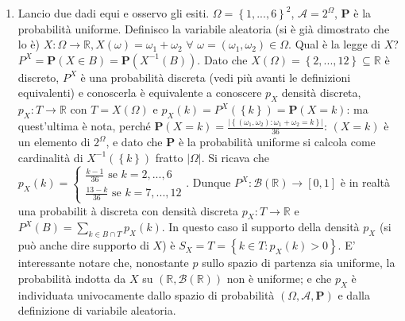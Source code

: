 \documentclass{article}
\begin{document}
\begin{enumerate}
\item Lancio due dadi equi e osservo gli esiti. $\Omega =\left\{
1,...,6\right\} ^{2}$, $\mathcal{A}=2^{\Omega }$, $\mathbf{P}$ \`{e} la
probabilit\`{a} uniforme. Definisco la variabile aleatoria (si \`{e} gi\`{a}
dimostrato che lo \`{e}) $X:\Omega \rightarrow 
\mathbb{R}
,X\left( \omega \right) =\omega _{1}+\omega _{2}$ $\forall $ $\omega =\left(
\omega _{1},\omega _{2}\right) \in \Omega $. Qual \`{e} la legge di $X$? $%
P^{X}=\mathbf{P}\left( X\in B\right) =\mathbf{P}\left( X^{-1}\left( B\right)
\right) $. Dato che $X\left( \Omega \right) =\left\{ 2,...,12\right\}
\subseteq 
\mathbb{R}
$ \`{e} discreto, $P^{X}$ \`{e} una probabilit\`{a} discreta (vedi pi\`{u}
avanti le definizioni equivalenti) e conoscerla \`{e} equivalente a
conoscere $p_{X}$ densit\`{a} discreta, $p_{X}:T\rightarrow 
\mathbb{R}
$ con $T=X\left( \Omega \right) $ e $p_{X}\left( k\right) =P^{X}\left(
\left\{ k\right\} \right) =\mathbf{P}\left( X=k\right) $: ma quest'ultima 
\`{e} nota, perch\'{e} $\mathbf{P}\left( X=k\right) =\frac{\left\vert
\left\{ \left( \omega _{1},\omega _{2}\right) :\omega _{1}+\omega
_{2}=k\right\} \right\vert }{36}$: $\left( X=k\right) $ \`{e} un elemento di 
$2^{\Omega }$, e dato che $\mathbf{P}$ \`{e} la probabilit\`{a} uniforme si
calcola come cardinalit\`{a} di $X^{-1}\left( \left\{ k\right\} \right) $
fratto $\left\vert \Omega \right\vert $. Si ricava che $p_{X}\left( k\right)
=\left\{ 
\begin{array}{c}
\frac{k-1}{36}\text{ se }k=2,...,6 \\ 
\frac{13-k}{36}\text{ se }k=7,...,12%
\end{array}%
\right. $. Dunque $P^{X}:\mathcal{B}\left( 
\mathbb{R}
\right) \rightarrow \left[ 0,1\right] $ \`{e} in realt\`{a} una probabilit%
\`{a} discreta con densit\`{a} discreta $p_{X}:T\rightarrow 
\mathbb{R}
$ e $P^{X}\left( B\right) =\sum_{k\in B\cap T}p_{X}\left( k\right) $. In
questo caso il supporto della densit\`{a} $p_{X}$ (si pu\`{o} anche dire
supporto di $X$) \`{e} $S_{X}=T=\left\{ k\in T:p_{X}\left( k\right)
>0\right\} $. E' interessante notare che, nonostante $p$ sullo spazio di
partenza sia uniforme, la probabilit\`{a} indotta da $X$ su $\left( 
\mathbb{R}
,\mathcal{B}\left( 
\mathbb{R}
\right) \right) $ non \`{e} uniforme; e che $p_{X}$ \`{e} individuata
univocamente dallo spazio di probabilit\`{a} $\left( \Omega ,\mathcal{A},%
\mathbf{P}\right) $ e dalla definizione di variabile aleatoria.


\end{enumerate}
\end{document}
